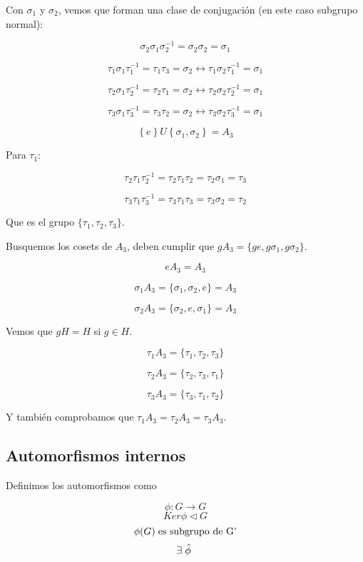 Con $\sigma _1$ y $\sigma _2$, vemos que forman una clase de conjugación (en este caso subgrupo normal):

\smallskip

$$\sigma _2\sigma _1 \sigma _2^{-1}=\sigma _2 \sigma _2=\sigma _1$$

$$\tau _1\sigma _1 \tau ^{-1}_1=\tau _1\tau _3=\sigma _2 \leftrightarrow \tau _1 \sigma _2 \tau _1 ^{-1}=\sigma _1$$

$$\tau _2\sigma _1 \tau ^{-1}_2=\tau _2\tau _1=\sigma _2 \leftrightarrow \tau _2 \sigma _2 \tau _2 ^{-1}=\sigma _1$$

$$\tau _3\sigma _1 \tau ^{-1}_3=\tau _3\tau _2=\sigma _2 \leftrightarrow \tau _3 \sigma _2 \tau _3 ^{-1}=\sigma _1$$

\smallskip
$$\left \lbrace e \right \rbrace U \left \lbrace \sigma _1, \sigma _2 \right \rbrace=A_3$$

Para $\tau _1$:

$$\tau _2 \tau _1 \tau _2^{-1}=\tau _2\tau _1 \tau _2 =\tau _2 \sigma _1=\tau _3$$

$$\tau _3 \tau _1 \tau _3^{-1}=\tau _3\tau _1 \tau _3 =\tau _3 \sigma _2=\tau _2$$

Que es el grupo $\lbrace \tau _1, \tau _2 , \tau _3 \rbrace$.

Busquemos los cosets de $A_3$, deben cumplir que $gA_3=\lbrace ge, g\sigma _1, g\sigma _2\rbrace$.

$$eA_3=A_3$$

$$\sigma _1 A_3=\lbrace \sigma _1, \sigma _2 , e \rbrace=A_3$$

$$\sigma _2 A_3=\lbrace \sigma _2, e, \sigma _1 \rbrace=A_3$$

Vemos que $gH=H$ si $g\in H$.

$$\tau _1 A_3=\lbrace \tau _1, \tau _2, \tau _3\rbrace$$

$$\tau _2 A_3=\lbrace \tau _2, \tau _3, \tau _1\rbrace$$

$$\tau _3 A_3=\lbrace \tau _3, \tau _1, \tau _2\rbrace$$

Y también comprobamos que $\tau _1 A_3=\tau _2 A_3=\tau _3 A_3$.


\subsection{Automorfismos internos}

Definimos los automorfismos como

$$\phi : G \to G$$
$$Ker \phi \lhd G$$
$$\phi (G) \hspace{0.1cm} \text{es subgrupo de G'}$$
$$\exists \hspace{0.1cm} \hat{\phi} \hspace{0.1cm} $$

